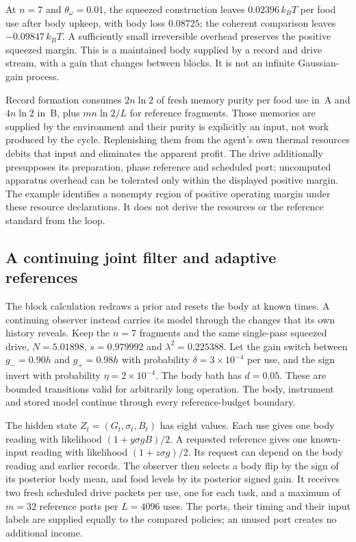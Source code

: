 \documentclass[12pt]{article}
\theoremstyle{definition}
\begin{document}
At $n=7$ and $\theta_\omega=0.01$, the squeezed construction leaves $0.02396\,k_BT$ per food use after body upkeep, with body loss $0.08725$; the coherent comparison leaves $-0.09847\,k_BT$. A sufficiently small irreversible overhead preserves the positive squeezed margin. This is a maintained body supplied by a record and drive stream, with a gain that changes between blocks. It is not an infinite Gaussian-gain process.

Record formation consumes $2n\ln2$ of fresh memory purity per food use in~A and $4n\ln2$ in~B, plus $mn\ln2/L$ for reference fragments. Those memories are supplied by the environment and their purity is explicitly an input, not work produced by the cycle. Replenishing them from the agent's own thermal resources debits that input and eliminates the apparent profit. The drive additionally presupposes its preparation, phase reference and scheduled port; uncomputed apparatus overhead can be tolerated only within the displayed positive margin. The example identifies a nonempty region of positive operating margin under these resource declarations. It does not derive the resources or the reference standard from the loop.

\subsection{A continuing joint filter and adaptive references}
\label{subsec:online_joint}

The block calculation redraws a prior and resets the body at known times. A continuing observer instead carries its model through the changes that its own history reveals. Keep the $n=7$ fragments and the same single-pass squeezed drive, $N=5.01898$, $s=0.979992$ and $\lambda^2=0.225388$. Let the gain switch between $g_-=0.90h$ and $g_+=0.98h$ with probability $\delta=3\times10^{-4}$ per use, and the sign invert with probability $\eta=2\times10^{-4}$. The body bath has $d=0.05$. These are bounded transitions valid for arbitrarily long operation. The body, instrument and stored model continue through every reference-budget boundary.

The hidden state $Z_t=(G_t,\sigma_t,B_t)$ has eight values. Each use gives one body reading with likelihood $(1+y\sigma g B)/2$. A requested reference gives one known-input reading with likelihood $(1+z\sigma g)/2$. Its request can depend on the body reading and earlier records. The observer then selects a body flip by the sign of its posterior body mean, and food levels by its posterior signed gain. It receives two fresh scheduled drive packets per use, one for each task, and a maximum of $m=32$ reference ports per $L=4096$ uses. The ports, their timing and their input labels are supplied equally to the compared policies; an unused port creates no additional income.
\end{document}
